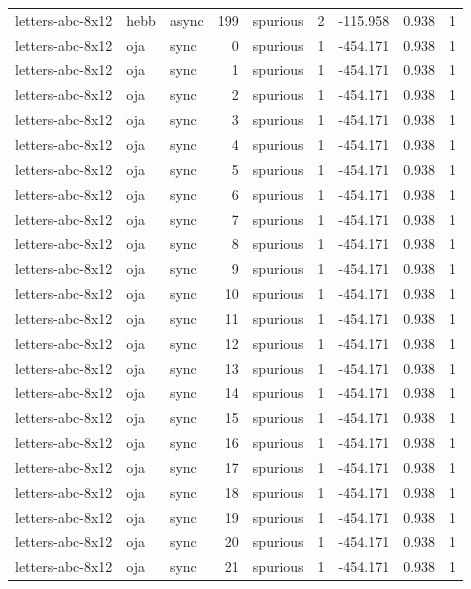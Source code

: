 \begin{tabular}{lllrlrrrr}
letters-abc-8x12 & hebb & async & 199 & spurious & 2 & -115.958 & 0.938 & 1 \\
letters-abc-8x12 & oja & sync & 0 & spurious & 1 & -454.171 & 0.938 & 1 \\
letters-abc-8x12 & oja & sync & 1 & spurious & 1 & -454.171 & 0.938 & 1 \\
letters-abc-8x12 & oja & sync & 2 & spurious & 1 & -454.171 & 0.938 & 1 \\
letters-abc-8x12 & oja & sync & 3 & spurious & 1 & -454.171 & 0.938 & 1 \\
letters-abc-8x12 & oja & sync & 4 & spurious & 1 & -454.171 & 0.938 & 1 \\
letters-abc-8x12 & oja & sync & 5 & spurious & 1 & -454.171 & 0.938 & 1 \\
letters-abc-8x12 & oja & sync & 6 & spurious & 1 & -454.171 & 0.938 & 1 \\
letters-abc-8x12 & oja & sync & 7 & spurious & 1 & -454.171 & 0.938 & 1 \\
letters-abc-8x12 & oja & sync & 8 & spurious & 1 & -454.171 & 0.938 & 1 \\
letters-abc-8x12 & oja & sync & 9 & spurious & 1 & -454.171 & 0.938 & 1 \\
letters-abc-8x12 & oja & sync & 10 & spurious & 1 & -454.171 & 0.938 & 1 \\
letters-abc-8x12 & oja & sync & 11 & spurious & 1 & -454.171 & 0.938 & 1 \\
letters-abc-8x12 & oja & sync & 12 & spurious & 1 & -454.171 & 0.938 & 1 \\
letters-abc-8x12 & oja & sync & 13 & spurious & 1 & -454.171 & 0.938 & 1 \\
letters-abc-8x12 & oja & sync & 14 & spurious & 1 & -454.171 & 0.938 & 1 \\
letters-abc-8x12 & oja & sync & 15 & spurious & 1 & -454.171 & 0.938 & 1 \\
letters-abc-8x12 & oja & sync & 16 & spurious & 1 & -454.171 & 0.938 & 1 \\
letters-abc-8x12 & oja & sync & 17 & spurious & 1 & -454.171 & 0.938 & 1 \\
letters-abc-8x12 & oja & sync & 18 & spurious & 1 & -454.171 & 0.938 & 1 \\
letters-abc-8x12 & oja & sync & 19 & spurious & 1 & -454.171 & 0.938 & 1 \\
letters-abc-8x12 & oja & sync & 20 & spurious & 1 & -454.171 & 0.938 & 1 \\
letters-abc-8x12 & oja & sync & 21 & spurious & 1 & -454.171 & 0.938 & 1 \\

\end{tabular}
